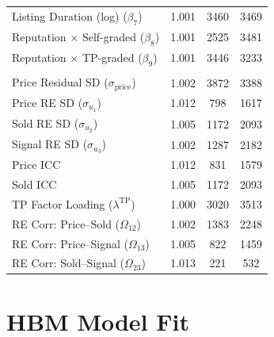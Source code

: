 \documentclass[11pt,letterpaper]{article}
\theoremstyle{definition}
\begin{document}
\begin{table}[H]
\begin{tabular}[t]{lccc}
\hspace{1em}Listing Duration (log) ($\beta_7$) & 1.001 & 3460 & 3469\\
\hspace{1em}Reputation $\times$ Self-graded ($\beta_8$) & 1.001 & 2525 & 3481\\
\hspace{1em}Reputation $\times$ TP-graded ($\beta_9$) & 1.001 & 3446 & 3233\\
\addlinespace[0.3em]
\multicolumn{4}{l}{\fontsize{8}{9.6}\selectfont \textbf{Variance/Structural}}\\
\hspace{1em}Price Residual SD ($\sigma_{\text{price}}$) & 1.002 & 3872 & 3388\\
\hspace{1em}Price RE SD ($\sigma_{u_1}$) & 1.012 & 798 & 1617\\
\hspace{1em}Sold RE SD ($\sigma_{u_2}$) & 1.005 & 1172 & 2093\\
\hspace{1em}Signal RE SD ($\sigma_{u_3}$) & 1.002 & 1287 & 2182\\
\hspace{1em}Price ICC & 1.012 & 831 & 1579\\
\hspace{1em}Sold ICC & 1.005 & 1172 & 2093\\
\hspace{1em}TP Factor Loading ($\lambda^{\text{TP}}$) & 1.000 & 3020 & 3513\\
\hspace{1em}RE Corr: Price--Sold ($\Omega_{12}$) & 1.002 & 1383 & 2248\\
\hspace{1em}RE Corr: Price--Signal ($\Omega_{13}$) & 1.005 & 822 & 1459\\
\hspace{1em}RE Corr: Sold--Signal ($\Omega_{23}$) & 1.013 & 221 & 532\\
\bottomrule
\end{tabular}

\end{table}

\clearpage
\section{HBM Model Fit}\label{sec:res-G}
\end{document}
